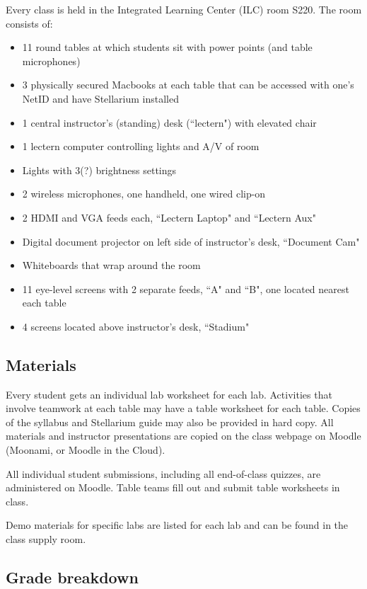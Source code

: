 \documentclass[12pt]{article}
\begin{document}
Every class is held in the Integrated Learning Center (ILC) room S220. The room consists of:
\begin{itemize}
\item 11 round tables at which students sit with power points (and table microphones)
\item 3 physically secured Macbooks at each table that can be accessed with one’s NetID and have Stellarium installed
\item 1 central instructor’s (standing) desk (“lectern") with elevated chair
\item 1 lectern computer controlling lights and A/V of room
\item Lights with 3(?) brightness settings
\item 2 wireless microphones, one handheld, one wired clip-on
\item 2 HDMI and VGA feeds each, “Lectern Laptop" and “Lectern Aux"
\item Digital document projector on left side of instructor’s desk, “Document Cam"
\item Whiteboards that wrap around the room
\item 11 eye-level screens with 2 separate feeds, “A" and “B", one located nearest each table
\item 4 screens located above instructor’s desk, “Stadium"
\end{itemize}


\subsection{Materials}

Every student gets an individual lab worksheet for each lab. Activities that involve teamwork at each table may have a table worksheet for each table. Copies of the syllabus and Stellarium guide may also be provided in hard copy. All materials and instructor presentations are copied on the class webpage on Moodle (Moonami, or Moodle in the Cloud).

All individual student submissions, including all end-of-class quizzes, are administered on Moodle. Table teams fill out and submit table worksheets in class.

Demo materials for specific labs are listed for each lab and can be found in the class supply room.


\subsection{Grade breakdown}
\end{document}
